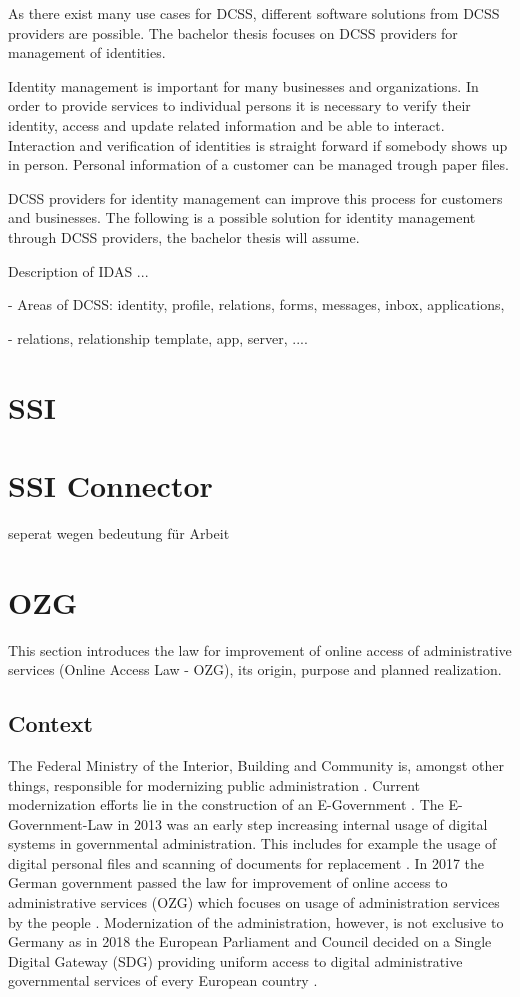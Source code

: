 \documentclass[
     12pt,         %
     a4paper,      %
     BCOR=10mm,version=first,     %
     DIV=14,version=first,        %
     ]{scrreprt}
\begin{document}
As there exist many use cases for DCSS, different software solutions from DCSS providers are possible. The bachelor thesis focuses on DCSS providers for management of identities.

Identity management is important for many businesses and organizations. In order to provide services to individual persons it is necessary to verify their identity, access and update related information and be able to interact. Interaction and verification of identities is straight forward if somebody shows up in person. Personal information of a customer can be managed trough paper files.

DCSS providers for identity management can improve this process for customers and businesses. The following is a possible solution for identity management through DCSS providers, the bachelor thesis will assume.

Description of IDAS ...

- Areas of DCSS: identity, profile, relations, forms, messages, inbox, applications, 

- relations, relationship template, app, server, ....

\section{SSI}

\section{SSI Connector}
seperat wegen bedeutung für Arbeit

\section{OZG}

This section introduces the law for improvement of online access of administrative services (Online Access Law - OZG), its origin, purpose and planned realization.

\subsection{Context}

The Federal Ministry of the Interior, Building and Community is, amongst other things, responsible for modernizing public administration \cite{BMI:Moderne_Verwaltung}. Current modernization efforts lie in the construction of an E-Government \cite{BMI:Behoerdengaenge}.
The E-Government-Law in 2013 was an early step increasing internal usage of digital systems in governmental administration. This includes for example the usage of digital personal files and scanning of documents for replacement \cite{BMI:E-Government_Gesetz}. 
In 2017 the German government passed the law for improvement of online access to administrative services (OZG) which focuses on usage of administration services by the people \cite{BMI:Onlinezugangsgesetz}. 
Modernization of the administration, however, is not exclusive to Germany as in 2018 the European Parliament and Council decided on a Single Digital Gateway (SDG) providing uniform access to digital administrative governmental services of every European country \cite{BMI:Single_Digital_Gateway}.
\end{document}
